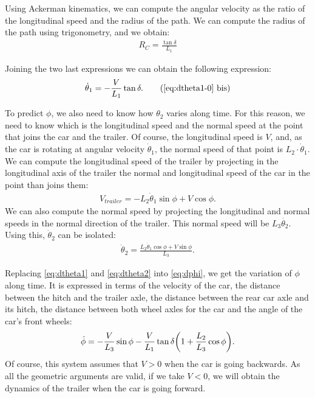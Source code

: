 Using Ackerman kinematics, we can compute the angular velocity as the ratio of the longitudinal speed and the
radius of the path. We can compute the radius of the path using trigonometry, and we obtain:
\begin{align*}
    R_C = \frac{\tan \delta}{L_1}
\end{align*}

Joining the two last expressions we can obtain the following expression:
\begin{align}\label{eq:dtheta1}
    \dot{\theta}_{1} = -\frac{V}{L_{1}} \tan \delta . \tag{\ref{eq:dtheta1-0} bis}
\end{align}


To predict $\phi$, we also need to know how $\theta_{2}$ varies along time. For this reason, we need to know which is the longitudinal speed and the normal speed at the point that joins the car and the trailer. Of course, the longitudinal speed is $V$, and, as the car is rotating at angular velocity $\dot{\theta}_{1}$, the normal speed of that point is $L_2\cdot\dot{\theta}_{1}$. We can compute the longitudinal speed of the trailer by projecting in the longitudinal axis of the trailer the normal and longitudinal speed of the car in the point than joins them:
\begin{align}
    V_{trailer} = -L_{2} \dot{\theta}_{1} \sin \phi + V \cos \phi .
\end{align}
We can also compute the normal speed by projecting the longitudinal and normal speeds in the normal direction of the trailer. This normal speed will be $L_3\dot{\theta_2}$. 
Using this, $\dot{\theta}_{2}$ can be isolated:
\begin{align}\label{eq:dtheta2}
    \dot{\theta}_{2} =  \frac{L_{2} \dot{\theta}_{1} \cos \phi + V \sin \phi }{L_{3}} .
\end{align}

Replacing \eqref{eq:dtheta1} and \eqref{eq:dtheta2} into \eqref{eq:dphi}, we get the variation of $\phi$ along time. It is expressed in terms of the velocity of the car, the distance between the hitch and the trailer axle, the distance between the rear car axle and its hitch, the distance between both wheel axles for the car and the angle of the car’s front wheels:
\begin{align}\label{eq:dotphi-final}
    \dot{\phi} = - \frac{V}{L_{3}} \sin \phi - \frac{V}{L_{1}} \tan \delta \qty( 1 + \frac{L_{2}}{L_{3}} \cos \phi ) .
\end{align}
Of course, this system assumes that $V>0$ when the car is going backwards. As all the geometric arguments are valid, if we take $V < 0$, we will obtain the dynamics of the trailer when the car is going forward.

